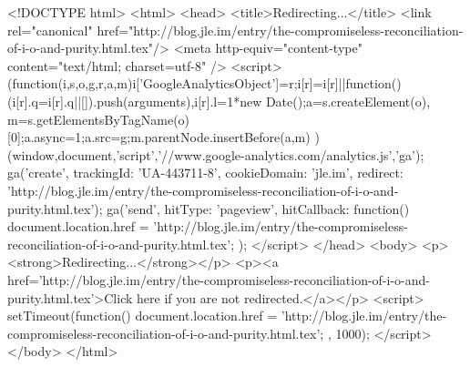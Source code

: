 <!DOCTYPE html>
<html>
<head>
<title>Redirecting...</title>
<link rel="canonical" href="http://blog.jle.im/entry/the-compromiseless-reconciliation-of-i-o-and-purity.html.tex"/>
<meta http-equiv="content-type" content="text/html; charset=utf-8" />
<script>
(function(i,s,o,g,r,a,m){i['GoogleAnalyticsObject']=r;i[r]=i[r]||function(){
(i[r].q=i[r].q||[]).push(arguments)},i[r].l=1*new Date();a=s.createElement(o),
m=s.getElementsByTagName(o)[0];a.async=1;a.src=g;m.parentNode.insertBefore(a,m)
})(window,document,'script','//www.google-analytics.com/analytics.js','ga');
ga('create', { trackingId: 'UA-443711-8', cookieDomain: 'jle.im', redirect: 'http://blog.jle.im/entry/the-compromiseless-reconciliation-of-i-o-and-purity.html.tex'});
ga('send', { hitType: 'pageview', hitCallback: function() { document.location.href = 'http://blog.jle.im/entry/the-compromiseless-reconciliation-of-i-o-and-purity.html.tex'; } });
</script>
</head>
<body>
  <p><strong>Redirecting...</strong></p>
  <p><a href='http://blog.jle.im/entry/the-compromiseless-reconciliation-of-i-o-and-purity.html.tex'>Click here if you are not redirected.</a></p>
  <script>
    setTimeout(function() { document.location.href = 'http://blog.jle.im/entry/the-compromiseless-reconciliation-of-i-o-and-purity.html.tex'; }, 1000);
  </script>
</body>
</html>
